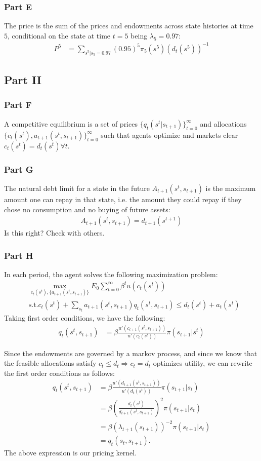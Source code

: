 \documentclass[11pt]{article} %
\begin{document}
\subsubsection{Part E}
The price is the sum of the prices and endowments across state histories at time $5$, conditional on the state at time $t=5$ being $\lambda_5 = 0.97$:
\begin{align*}
P^5 &= \sum_{s^5|s_5= 0.97} (0.95)^5 \pi_5(s^5)(d_t(s^5))^{-1}
\end{align*}
\subsection{Part II}
\subsubsection{Part F}
A competitive equilibrium is a set of prices $\{q_t(s^t|s_{t+1})\}_{t=0}^{\infty}$ and allocations $\{ c_t(s^t),a_{t+1}(s^t,s_{t+1})  \}_{t=0}^{\infty}$ such that agents optimize and markets clear $c_t(s^t)  = d_t(s^t) \forall t.$
\subsubsection{Part G}
The natural debt limit for a state in the future $A_{t+1}(s^t,s_{t+1})$ is the maximum amount one can repay in that state, i.e. the amount they could repay if they chose no consumption and no buying of future assets:
\begin{align*}
A_{t+1}(s^t,s_{t+1}) = d_{t+1}(s^{t+1})
\end{align*}
Is this right? Check with others.
\subsubsection{Part H}
In each period, the agent solves the following maximization problem: 
\begin{align*}
&\max_{c_t(s^t),\{a_{t+1}(s^t,s_{t+1})\}} E_0\sum_{t=0}^{\infty} \beta^t u(c_t(s^t))\\
&\text{s.t.} c_t(s^t) + \sum_{s_t}a_{t+1}(s^t,s_{t+1})q_t(s^t,s_{t+1}) \leq d_{t}(s^t) + a_t(s^t)
\end{align*}
Taking first order conditions, we have the following:
\begin{align*}
q_t(s^t,s_{t+1}) &= \beta \frac{u'(c_{t+1}(s^t,s_{t+1}))}{u'(c_t(s^t))}\pi(s_{t+1}|s^t)
\end{align*}

Since the endowments are governed by a markov process, and since we know that the feasible allocations satisfy $c_t \leq d_t \Rightarrow c_t = d_t$ optimizes utility, we can rewrite the first order conditions as follows:
\begin{align*}
q_t(s^t,s_{t+1}) &= \beta \frac{u'(d_{t+1}(s^t,s_{t+1}))}{u'(d_t(s^t))}\pi(s_{t+1}|s_t)\\
&= \beta \left(\frac{d_t(s^t)}{d_{t+1}(s^t,s_{t+1})}\right)^2 \pi(s_{t+1}|s_t)\\
&= \beta (\lambda_{t+1}(s_{t+1}))^{-2}\pi(s_{t+1}|s_t)\\
&= q_t(s_t,s_{t+1}).
\end{align*}
The above expression is our pricing kernel.
\end{document}
